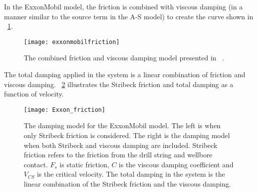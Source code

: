 In the ExxonMobil model, the friction is combined with viscous damping (in a manner similar to the source term in the A-S model) to create the curve shown in \figurename~\ref{fig:exxonmobilfriction}.
\begin{figure}
	\centering
	\texttt{[image: exxonmobilfriction]}
	\caption[Comparison of friction models]{The combined friction and viscous damping model presented in ~\cite{ref:dixit2021a}.}
	\label{fig:exxonmobilfriction}
\end{figure}
The total damping applied in the system is a linear combination of friction and viscous damping. \figurename~\ref{figure_Exxon_friction} illustrates the Stribeck friction and total damping as a function of velocity.
\begin{figure}
	\centering
	\texttt{[image: Exxon\_friction]}
    \caption[Damping model for ExxonMobil model]{The damping model for the ExxonMobil model. The left is when only Stribeck friction is considered. The right is the damping model when both Stribeck and viscous damping are included. Stribeck friction refers to the friction from the drill string and wellbore contact. $F_{s}$ is static friction, $C$ is the viscous damping coefficient and $V_{CS}$ is the critical velocity. The total damping in the system is the linear combination of the Stribeck friction and the viscous damping.}
    \label{figure_Exxon_friction}
\end{figure}



